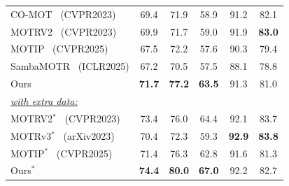 \documentclass[11pt]{article}
\begin{document}
\begin{table}[htbp]
{\begin{tabular}{l@{\hspace{2pt}}ccc|cc}
    CO-MOT~ (CVPR2023) & 69.4 & 71.9 & 58.9 & 91.2 & 82.1 \\
    MOTRV2~ (CVPR2023) & 69.9 & 71.7 & 59.0 & 91.9 & \textbf{83.0} \\
    MOTIP~ (CVPR2025) & 67.5 & 72.2 & 57.6 & 90.3 & 79.4 \\
    SambaMOTR~ (ICLR2025) & 67.2 & 70.5 & 57.5 & 88.1 & 78.8 \\
    \rowcolor{gray!20} Ours & \textbf{71.7} & \textbf{77.2} & \textbf{63.5} & 91.3 & 81.0 \\
     \midrule
    \textit{\underline{with extra data:}} \\
    MOTRV2$^*$~ (CVPR2023) & 73.4 & 76.0 & 64.4 & 92.1 & 83.7 \\
    MOTRv3$^*$~ (arXiv2023) & 70.4 & 72.3 & 59.3 & \textbf{92.9} & \textbf{83.8} \\
    MOTIP$^*$~ (CVPR2025) & 71.4 & 76.3 & 62.8 & 91.6 & 81.3 \\
    \rowcolor{gray!20} Ours$^*$ & \textbf{74.4} & \textbf{80.0} & \textbf{67.0} & 92.2 & 82.7 \\
     \bottomrule
 \end{tabular}
}
\end{table}
\end{document}
